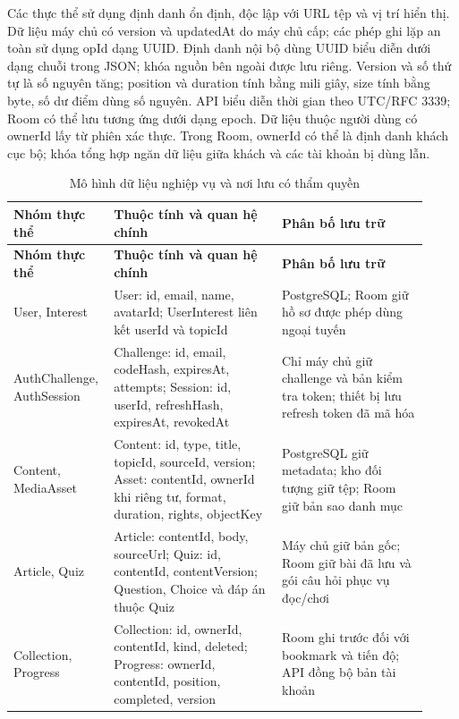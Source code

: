 Các thực thể sử dụng định danh ổn định, độc lập với URL tệp và vị trí hiển thị. Dữ liệu máy chủ có version và updatedAt do máy chủ cấp; các phép ghi lặp an toàn sử dụng opId dạng UUID. Định danh nội bộ dùng UUID biểu diễn dưới dạng chuỗi trong JSON; khóa nguồn bên ngoài được lưu riêng. Version và số thứ tự là số nguyên tăng; position và duration tính bằng mili giây, size tính bằng byte, số dư điểm dùng số nguyên. API biểu diễn thời gian theo UTC/RFC 3339; Room có thể lưu tương ứng dưới dạng epoch. Dữ liệu thuộc người dùng có ownerId lấy từ phiên xác thực. Trong Room, ownerId có thể là định danh khách cục bộ; khóa tổng hợp ngăn dữ liệu giữa khách và các tài khoản bị dùng lẫn.
\begingroup
\small
\renewcommand{\arraystretch}{1.2}
\setlength{\tabcolsep}{3pt}
\begin{longtable}{>{\RaggedRight\arraybackslash}p{0.19\linewidth}>{\RaggedRight\arraybackslash}p{0.39\linewidth}>{\RaggedRight\arraybackslash}p{0.34\linewidth}}
\caption{Mô hình dữ liệu nghiệp vụ và nơi lưu có thẩm quyền}
\label{tab:data-sync}\\
\toprule
\textbf{Nhóm thực thể} & \textbf{Thuộc tính và quan hệ chính} & \textbf{Phân bố lưu trữ} \\
\midrule
\endfirsthead
\toprule
\textbf{Nhóm thực thể} & \textbf{Thuộc tính và quan hệ chính} & \textbf{Phân bố lưu trữ} \\
\midrule
\endhead
\bottomrule
\endfoot
User, Interest & User: id, email, name, avatarId; UserInterest liên kết userId và topicId & PostgreSQL; Room giữ hồ sơ được phép dùng ngoại tuyến \\
AuthChallenge, AuthSession & Challenge: id, email, codeHash, expiresAt, attempts; Session: id, userId, refreshHash, expiresAt, revokedAt & Chỉ máy chủ giữ challenge và bản kiểm tra token; thiết bị lưu refresh token đã mã hóa \\
Content, MediaAsset & Content: id, type, title, topicId, sourceId, version; Asset: contentId, ownerId khi riêng tư, format, duration, rights, objectKey & PostgreSQL giữ metadata; kho đối tượng giữ tệp; Room giữ bản sao danh mục \\
Article, Quiz & Article: contentId, body, sourceUrl; Quiz: id, contentId, contentVersion; Question, Choice và đáp án thuộc Quiz & Máy chủ giữ bản gốc; Room giữ bài đã lưu và gói câu hỏi phục vụ đọc/chơi \\
Collection, Progress & Collection: id, ownerId, contentId, kind, deleted; Progress: ownerId, contentId, position, completed, version & Room ghi trước đối với bookmark và tiến độ; API đồng bộ bản tài khoản \\

\end{longtable}
